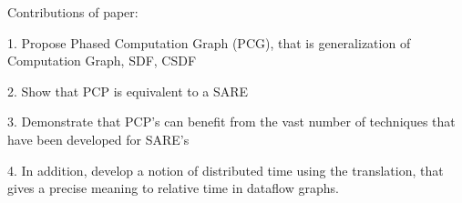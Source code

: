 Contributions of paper:

1. Propose Phased Computation Graph (PCG), that is generalization of
   Computation Graph, SDF, CSDF

2. Show that PCP is equivalent to a SARE 

3. Demonstrate that PCP's can benefit from the vast number of
   techniques that have been developed for SARE's

4. In addition, develop a notion of distributed time using the
   translation, that gives a precise meaning to relative time in
   dataflow graphs.

